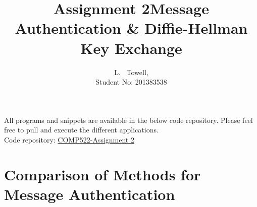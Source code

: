 \documentclass[a4paper, twoside, 11pt]{article}
\author{L. ~Towell,\\ Student No: 201383538}
\title{Assignment 2\break Message Authentication \& Diffie-Hellman Key Exchange}
\begin{document}
	\maketitle

\maketitle
\begin{center}
All programs and snippets are available in the below code repository. Please feel free to pull and execute the different applications.\\
Code repository: \href{https://github.com/luketowell/COMP522-Assignment2}{COMP522-Assignment 2}
\end{center}

\section{Comparison of Methods for Message Authentication}
\end{document}
